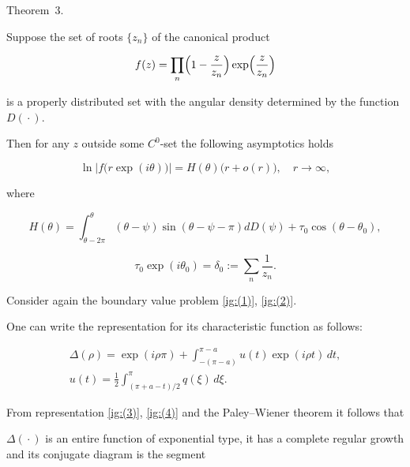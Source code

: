 {\small \sc Theorem~3.} {\it

 Suppose the set of roots $\{z_n\}$ of the canonical product

 $$

 f(z)=\prod\limits_n \Bigl(1-\frac{z}{z_n}\Bigr)\exp\Bigl(\frac{z}{z_n}\Bigr)

 $$

 is a properly distributed set with the angular density determined by the function $D({}\cdot{}).$ 

 Then for any $z$ outside some $C^0$-set the following asymptotics holds

 $$

 \ln\bigl|f\bigl(r\exp(i\theta)\bigr)\bigr|=H(\theta)\bigl(r+o(r)\bigr), \quad r\to\infty,

 $$

 where

 $$

 H(\theta)=\int_{\theta-2\pi}^\theta (\theta-\psi)\sin(\theta-\psi-\pi)dD(\psi)+\tau_0\cos(\theta-\theta_0),

 $$

 $$

 \tau_0\exp(i\theta_0)=\delta_0:=\sum\limits_{n}\frac{1}{z_n}.

 $$

 }

 

 \smallskip



Consider again the boundary value problem \eqref{ig:(1)}, \eqref{ig:(2)}.

One can write the representation for its characteristic function as follows:

\begin{gather}

\label{ig:(3)}

\Delta(\rho)=\exp(i\rho\pi)+\int_{-(\pi-a)}^{\pi-a} u(t) \exp(i\rho t)\,dt , 

\\

u(t)=\frac{1}{2}\int_{({\pi+a-t})/{2}}^\pi q(\xi)\, d\xi. 

\label{ig:(4)}

\end{gather}



From representation \eqref{ig:(3)}, \eqref{ig:(4)} and the Paley--Wiener theorem  it follows that

   $\Delta({}\cdot{})$ is an entire function of exponential type, it has a complete regular growth and its  conjugate diagram is the segment

